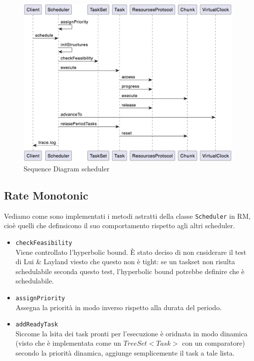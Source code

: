 \begin{figure}[htbp]
    \centering
    \includegraphics[width=.9\textwidth]{immagini/sequence diagram.pdf}
    \caption{Sequence Diagram scheduler}
    \label{fig:sequenceDiagram}
\end{figure}

\subsection{Rate Monotonic}
Vediamo come sono implementati i metodi astratti della classe \texttt{Scheduler} in RM, cioè quelli che definsicono il suo comportamento rispetto agli altri scheduler.
\begin{itemize}
    \item \texttt{checkFeasibility} \\
        Viene controllato l'hyperbolic bound. È stato deciso di non cnsiderare il test di Lui \& Layland viesto che questo non è tight: se un taskset non risulta schedulabile seconda questo test, l'hyperbolic bound potrebbe definire che è schedulabile.
    \item \texttt{assignPriority} \\
        Assegna la priorità in modo inverso rispetto alla durata del periodo.
    \item \texttt{addReadyTask} \\
        Siccome la lsita dei task pronti per l'esecuzione è oridnata in modo dinamica (visto che è implementata come un $TreeSet<Task>$ con un comparatore) secondo la priorità dinamica, aggiunge semplicemente il task a tale lista.
\end{itemize}

